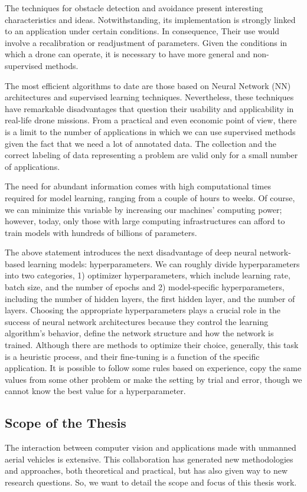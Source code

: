 The techniques for obstacle detection and avoidance present interesting characteristics and ideas. Notwithstanding, its implementation is strongly linked to an application under certain conditions. In consequence, Their use would involve a recalibration or readjustment of parameters. Given the conditions in which a drone can operate, it is necessary to have more general and non-supervised methods.

The most efficient algorithms to date are those based on Neural Network (NN) architectures and supervised learning techniques. Nevertheless, these techniques have remarkable disadvantages that question their usability and applicability in real-life drone missions. From a practical and even economic point of view, there is a limit to the number of applications in which we can use supervised methods given the fact that we need a lot of annotated data. The collection and the correct labeling of data representing a problem are valid only for a small number of applications.

The need for abundant information comes with high computational times required for model learning, ranging from a couple of hours to weeks. Of course, we can minimize this variable by increasing our machines' computing power; however, today, only those with large computing infrastructures can afford to train models with hundreds of billions of parameters.  

The above statement introduces the next disadvantage of deep neural network-based learning models: hyperparameters. We can roughly divide hyperparameters into two categories, 1) optimizer hyperparameters, which include learning rate, batch size, and the number of epochs and 2) model-specific hyperparameters, including the number of hidden layers, the first hidden layer, and the number of layers. Choosing the appropriate hyperparameters plays a crucial role in the success of neural network architectures because they control the learning algorithm's behavior, define the network structure and how the network is trained. Although there are methods to optimize their choice, generally, this task is a heuristic process, and their fine-tuning is a function of the specific application. It is possible to follow some rules based on experience, copy the same values from some other problem or make the setting by trial and error, though we cannot know the best value for a hyperparameter.

\subsection*{Scope of the Thesis}
The interaction between computer vision and applications made with unmanned aerial vehicles is extensive. This collaboration has generated new methodologies and approaches, both theoretical and practical, but has also given way to new research questions. So, we want to detail the scope and focus of this thesis work.

